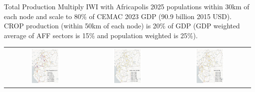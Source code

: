 \documentclass[aspectratio=169,xcolor=dvipsnames]{beamer}
\begin{document}
\begin{frame}{Total Production} \vspace{-3mm}
\small Multiply IWI with Africapolis 2025 populations within 30km of each node and scale to 80\% of CEMAC 2023 GDP (90.9 billion 2015 USD). CROP production (within 50km of each node) is 20\% of GDP (GDP weighted average of AFF sectors is 15\% and population weighted is 25\%). 
\begin{adjustbox}{center}
\begin{tabular}{@{}c@{}c@{}@{}c@{}}
\includegraphics[width=0.38\textwidth, trim= {7mm 0 7mm 0}, clip]{"../figures/trans_CEMAC_network_SPAM_TOP80.pdf"} & 
\includegraphics[width=0.38\textwidth, trim= {7mm 0 7mm 0}, clip]{"../figures/trans_CEMAC_network_GDP_other.pdf"} & 
\includegraphics[width=0.38\textwidth, trim= {7mm 0 7mm 0}, clip]{"../figures/trans_CEMAC_network_GDP.pdf"}
\end{tabular}
  \end{adjustbox}
\end{frame}
\end{document}

